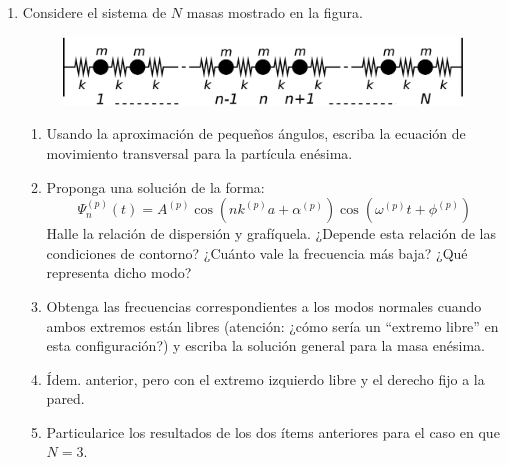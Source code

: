 \documentclass[11pt,spanish,a4paper]{article}
\begin{document}
\begin{enumerate}
\item Considere el sistema de $N$ masas mostrado en la figura. 
\begin{figure}[H]
	\begin{centering}
		\includegraphics[clip,scale=0.25]{ej1-11}
		\par
	\end{centering}
\end{figure}
\begin{enumerate}
	\item Usando la aproximación de pequeños ángulos, escriba la ecuación de movimiento transversal para la partícula enésima. 
	\item Proponga una solución de la forma:
	\[
	\Psi_{n}^{(p)}(t)=A^{(p)}\cos\left(nk^{(p)}a+\alpha^{(p)}\right)\cos\left(\omega^{(p)}t+\phi^{(p)}\right)
	\]
	Halle la relación de dispersión y grafíquela.
	¿Depende esta relación de las condiciones de contorno?
	¿Cuánto vale la frecuencia más baja?
	¿Qué representa dicho modo? 
	\item Obtenga las frecuencias correspondientes a los modos normales cuando ambos extremos están libres (atención: ¿cómo sería un ``extremo libre'' en esta configuración?) y escriba la solución general para la masa enésima. 
	\item Ídem. anterior, pero con el extremo izquierdo libre y el derecho fijo a la pared. 
	\item Particularice los resultados de los dos ítems anteriores para el caso en que $N=3$.
\end{enumerate}




\end{enumerate}
\end{document}
